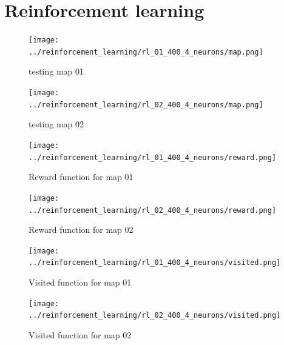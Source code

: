 \documentclass[10pt,a4paper]{article}
\begin{document}
\newpage
\section{Reinforcement learning}



\begin{figure}[ht]
\centering
\begin{minipage}[b]{.4\textwidth}

  \texttt{[image: ../reinforcement\_learning/rl\_01\_400\_4\_neurons/map.png]}
  \caption{testing map 01}
  \label{fig:rl_01_map}

\end{minipage} %
\begin{minipage}[b]{.4\textwidth}

\texttt{[image: ../reinforcement\_learning/rl\_02\_400\_4\_neurons/map.png]}
\caption{testing map 02}
\label{fig:rl_02_map}

\end{minipage}
\end{figure}




\begin{figure}[ht]
\centering
\begin{minipage}[b]{.6\textwidth}
\hspace*{-4cm}
  \centering
  \texttt{[image: ../reinforcement\_learning/rl\_01\_400\_4\_neurons/reward.png]}
  \caption{Reward function for map 01}
  \label{fig:rl_reward_01_map}

\end{minipage} %
\begin{minipage}[b]{.3\textwidth}
\hspace*{-2cm}
\centering
\texttt{[image: ../reinforcement\_learning/rl\_02\_400\_4\_neurons/reward.png]}
\caption{Reward function for map 02}
\label{fig:rl_reward_02_map}

\end{minipage}
\end{figure}



\begin{figure}[ht]
\centering
\begin{minipage}[b]{.6\textwidth}
\hspace*{-4cm}
  \centering
  \texttt{[image: ../reinforcement\_learning/rl\_01\_400\_4\_neurons/visited.png]}
  \caption{Visited function for map 01}
  \label{fig:rl_visited_01_map}

\end{minipage} %
\begin{minipage}[b]{.3\textwidth}
\hspace*{-2cm}
\centering
\texttt{[image: ../reinforcement\_learning/rl\_02\_400\_4\_neurons/visited.png]}
\caption{Visited function for map 02}
\label{fig:rl_visited_02_map}

\end{minipage}
\end{figure}
\end{document}
